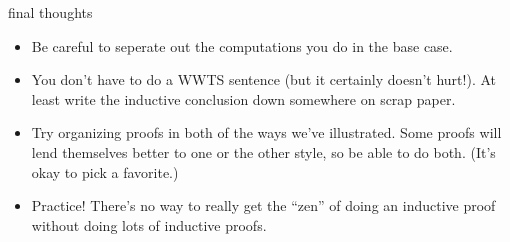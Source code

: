 \documentclass[handout,landscape]{beamer}
\begin{document}
\begin{frame}{final thoughts}
\begin{itemize}
\item Be careful to seperate out the computations you do in the base case. \pause
\item You don't have to do a WWTS sentence (but it certainly doesn't hurt!).  \pause \newline
At least write the inductive conclusion down somewhere on scrap paper. \pause
\item Try organizing proofs in both of the ways we've illustrated. \pause \newline
  Some proofs will lend themselves better to one or the other style, so be able to do both. \pause \newline
 (It's okay to pick a favorite.) \pause
\item Practice! \pause There's no way to really get the ``zen'' of doing an inductive proof without doing lots of inductive proofs.

\end{itemize}
\end{frame}
\end{document}
